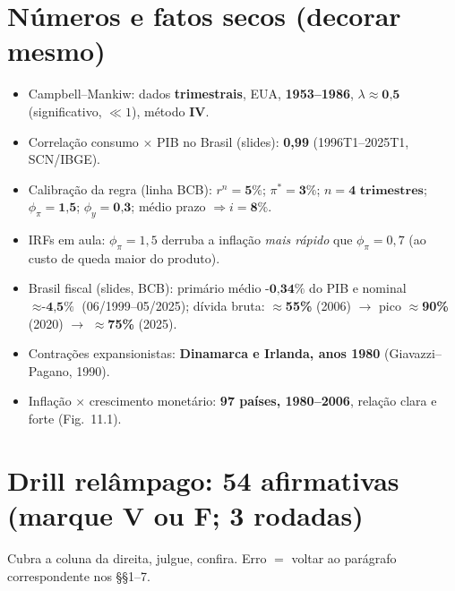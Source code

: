 \documentclass[12pt, a4paper]{article}
\begin{document}
\section{Números e fatos secos (decorar mesmo)}

\begin{resultbox}[title={Cartela de números}]
\begin{itemize}[leftmargin=1.4em, itemsep=0.15em]
\item Campbell--Mankiw: dados \textbf{trimestrais}, EUA,
\textbf{1953--1986}, $\lambda \approx \textbf{0,5}$ (significativo,
$\ll 1$), método \textbf{IV}.
\item Correlação consumo $\times$ PIB no Brasil (slides):
\textbf{0,99} (1996T1--2025T1, SCN/IBGE).
\item Calibração da regra (linha BCB): $r^n = \textbf{5\%}$;
$\pi^* = \textbf{3\%}$; $n = \textbf{4 trimestres}$;
$\phi_\pi = \textbf{1,5}$; $\phi_y = \textbf{0,3}$;
médio prazo $\Rightarrow i = \textbf{8\%}$.
\item IRFs em aula: $\phi_\pi = 1{,}5$ derruba a inflação \emph{mais rápido}
que $\phi_\pi = 0{,}7$ (ao custo de queda maior do produto).
\item Brasil fiscal (slides, BCB): primário médio $\textbf{-0,34\%}$ do PIB e
nominal $\approx \textbf{-4,5\%}$ (06/1999--05/2025); dívida bruta:
$\approx$\textbf{55\%} (2006) $\to$ pico $\approx$\textbf{90\%} (2020) $\to$
$\approx$\textbf{75\%} (2025).
\item Contrações expansionistas: \textbf{Dinamarca e Irlanda, anos 1980}
(Giavazzi--Pagano, 1990).
\item Inflação $\times$ crescimento monetário: \textbf{97 países,
1980--2006}, relação clara e forte (Fig.\ 11.1).
\end{itemize}
\end{resultbox}

\section{Drill relâmpago: 54 afirmativas (marque V ou F; 3 rodadas)}

Cubra a coluna da direita, julgue, confira. Erro $=$ voltar ao parágrafo
correspondente nos §§1--7.
\end{document}
